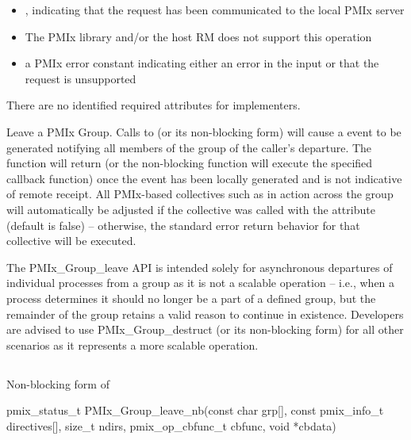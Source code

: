 \begin{itemize}
    \item {}, indicating that the request has been communicated to the local \ac{PMIx} server
    \item {} The \ac{PMIx} library and/or the host \ac{RM} does not support this operation
    \item a \ac{PMIx} error constant indicating either an error in the input or that the request is unsupported
\end{itemize}

\reqattrstart
There are no identified required attributes for implementers.
\reqattrend


\descr

Leave a PMIx Group. Calls to  (or its non-blocking form) will cause a  event to be generated notifying all members of the group of the caller’s departure. The function will return (or the non-blocking function will execute the specified callback function) once the event has been locally generated and is not indicative of remote receipt. All \ac{PMIx}-based collectives such as  in action across the group will automatically be adjusted if the collective was called with the  attribute (default is false) – otherwise, the standard error return behavior for that collective will be executed.

\adviceuserstart
The PMIx_Group_leave API is intended solely for asynchronous departures of individual processes from a group as it is not a scalable operation – i.e., when a process determines it should no longer be a part of a defined group, but the remainder of the group retains a valid reason to continue in existence. Developers are advised to use PMIx_Group_destruct (or its non-blocking form) for all other scenarios as it represents a more scalable operation.
\adviceuserend

\subsection{}

\summary

Non-blocking form of 

\format

\cspecificstart
\begin{codepar}
pmix_status_t
PMIx_Group_leave_nb(const char grp[],
                    const pmix_info_t directives[], size_t ndirs,
                    pmix_op_cbfunc_t cbfunc, void *cbdata)
\end{codepar}
\cspecificend


